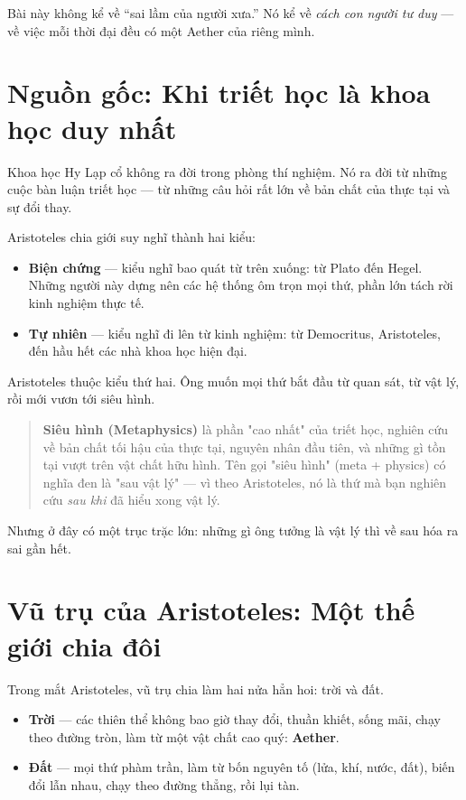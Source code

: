 Bài này không kể về ``sai lầm của người xưa.'' Nó kể về \emph{cách con người tư duy} — về việc mỗi thời đại đều có một Aether của riêng mình.


\section{Nguồn gốc: Khi triết học là khoa học duy nhất}

Khoa học Hy Lạp cổ không ra đời trong phòng thí nghiệm. Nó ra đời từ những cuộc bàn luận triết học — từ những câu hỏi rất lớn về bản chất của thực tại và sự đổi thay.

Aristoteles chia giới suy nghĩ thành hai kiểu:

\begin{itemize}
  \item \textbf{Biện chứng} — kiểu nghĩ bao quát từ trên xuống: từ Plato đến Hegel. Những người này dựng nên các hệ thống ôm trọn mọi thứ, phần lớn tách rời kinh nghiệm thực tế.
  \item \textbf{Tự nhiên} — kiểu nghĩ đi lên từ kinh nghiệm: từ Democritus, Aristoteles, đến hầu hết các nhà khoa học hiện đại.
\end{itemize}

Aristoteles thuộc kiểu thứ hai. Ông muốn mọi thứ bắt đầu từ quan sát, từ vật lý, rồi mới vươn tới siêu hình.

\begin{quote}
\textbf{Siêu hình (Metaphysics)} là phần "cao nhất" của triết học, nghiên cứu về bản chất tối hậu của thực tại, nguyên nhân đầu tiên, và những gì tồn tại vượt trên vật chất hữu hình. Tên gọi "siêu hình" (meta + physics) có nghĩa đen là "sau vật lý" — vì theo Aristoteles, nó là thứ mà bạn nghiên cứu \emph{sau khi} đã hiểu xong vật lý.
\end{quote}

Nhưng ở đây có một trục trặc lớn: những gì ông tưởng là vật lý thì về sau hóa ra sai gần hết.


\section{Vũ trụ của Aristoteles: Một thế giới chia đôi}

Trong mắt Aristoteles, vũ trụ chia làm hai nửa hẳn hoi: trời và đất.

\begin{itemize}
  \item \textbf{Trời} — các thiên thể không bao giờ thay đổi, thuần khiết, sống mãi, chạy theo đường tròn, làm từ một vật chất cao quý: \textbf{Aether}.
  \item \textbf{Đất} — mọi thứ phàm trần, làm từ bốn nguyên tố (lửa, khí, nước, đất), biến đổi lẫn nhau, chạy theo đường thẳng, rồi lụi tàn.
\end{itemize}

